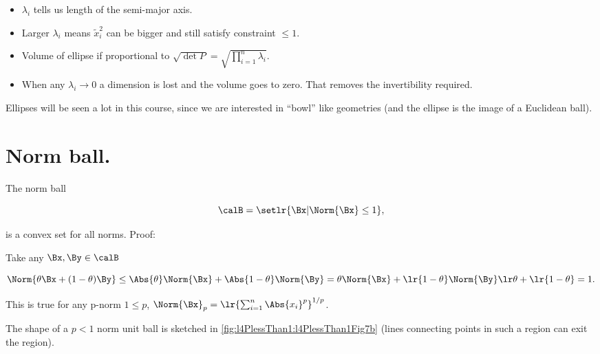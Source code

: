 
\begin{itemize}
\item \( \lambda_i \) tells us length of the semi-major axis.
\item Larger \( \lambda_i \) means \( \tilde{x}_i^2 \) can be bigger and still satisfy constraint \( \le 1 \).
\item Volume of ellipse if proportional to \( \sqrt{ \det P } = \sqrt{ \prod_{i = 1}^n \lambda_i } \).
\item When any \( \lambda_i \rightarrow 0 \) a dimension is lost and the volume goes to zero.  That removes the invertibility required.
\end{itemize}

Ellipses will be seen a lot in this course, since we are interested in ``bowl'' like geometries (and the ellipse is the image of a Euclidean ball).

\section{Norm ball.}

The norm ball

\begin{equation}\label{eqn:convexOptimizationLecture4:360}
\calB = \setlr{ \Bx | \Norm{\Bx} \le 1 },
\end{equation}

is a convex set for all norms.  Proof:

Take any \( \Bx, \By \in \calB \)

\begin{dmath}\label{eqn:convexOptimizationLecture4:380}
\Norm{ \theta \Bx + (1 - \theta) \By }
\le
\Abs{\theta} \Norm{ \Bx } + \Abs{1 - \theta} \Norm{ \By }
=
\theta \Norm{ \Bx } + \lr{1 - \theta} \Norm{ \By }
\lr
\theta + \lr{1 - \theta}
=
1.
\end{dmath}

This is true for any p-norm \( 1 \le p \), \( \Norm{\Bx}_p = \lr{ \sum_{i = 1}^n \Abs{x_i}^p }^{1/p} \).


The shape of a \( p < 1 \) norm unit ball is sketched in \cref{fig:l4PlessThan1:l4PlessThan1Fig7b} (lines connecting points in such a region can exit the region).

